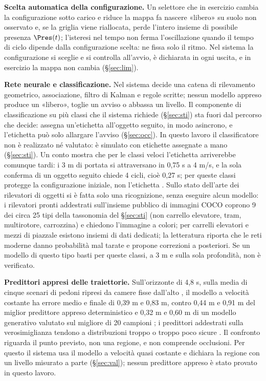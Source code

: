 \textbf{Scelta automatica della configurazione.} Un selettore che in esercizio cambia la configurazione sotto carico e riduce la mappa fa nascere «libero» su suolo non osservato e, se la griglia viene riallocata, perde l'intero insieme di possibile presenza $\Pres(t)$; l'isteresi nel tempo non ferma l'oscillazione quando il tempo di ciclo dipende dalla configurazione scelta: ne fissa solo il ritmo. Nel sistema la configurazione si sceglie e si controlla all'avvio, è dichiarata in ogni uscita, e in esercizio la mappa non cambia (\S\ref{sec:lim}). 

\textbf{Rete neurale e classificazione.} Nel sistema decide una catena di rilevamento geometrico, associazione, filtro di Kalman e regole scritte; nessun modello appreso produce un «libero», toglie un avviso o abbassa un livello. Il componente di classificazione su più classi che il sistema richiede (\S\ref{sec:sti}) sta fuori dal percorso che decide: assegna un'etichetta all'oggetto seguito, in modo asincrono, e l'etichetta può solo allargare l'avviso (\S\ref{sec:occ}). In questo lavoro il classificatore non è realizzato né valutato: è simulato con etichette assegnate a mano (\S\ref{sec:sti}). Un conto mostra che per le classi veloci l'etichetta arriverebbe comunque tardi: i 3 m di portata si attraversano in 0,75 s a 4 m/s, e la sola conferma di un oggetto seguito chiede 4 cicli, cioè 0,27 s; per queste classi protegge la configurazione iniziale, non l'etichetta . Sullo stato dell'arte dei rilevatori di oggetti si è fatta solo una ricognizione, senza eseguire alcun modello: i rilevatori pronti addestrati sull'insieme pubblico di immagini COCO coprono 9 dei circa 25 tipi della tassonomia del \S\ref{sec:sti} (non carrello elevatore, tram, multirotore, carrozzina) e chiedono l'immagine a colori; per carrelli elevatori e mezzi di piazzale esistono insiemi di dati dedicati; la letteratura riporta che le reti moderne danno probabilità mal tarate e propone correzioni a posteriori. Se un modello di questo tipo basti per queste classi, a 3 m e sulla sola profondità, non è verificato. 

\textbf{Predittori appresi delle traiettorie.} Sull'orizzonte di 4,8 s, sulla media di cinque scenari di pedoni ripresi da camere fisse dall'alto \cite{pellegrini2009,lerner2007}, il modello a velocità costante ha errore medio e finale di 0,39 m e 0,83 m, contro 0,44 m e 0,91 m del miglior predittore appreso deterministico e 0,32 m e 0,60 m di un modello generativo valutato sul migliore di 20 campioni \cite{scholler2020}; i predittori addestrati sulla verosimiglianza tendono a distribuzioni troppo o troppo poco sicure \cite{cheraghipouria2026}. Il confronto riguarda il punto previsto, non una regione, e non comprende occlusioni. Per questo il sistema usa il modello a velocità quasi costante e dichiara la regione con un livello misurato a parte (\S\ref{sec:val}); nessun predittore appreso è stato provato in questo lavoro.

